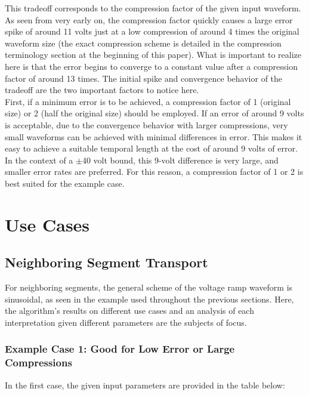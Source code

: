 \documentclass[11pt, a4paper]{article}
\theoremstyle{definition}
\numberwithin{equation}{section}
\begin{document}
This tradeoff corresponds to the compression factor of the given input waveform. As seen from very early on, the compression factor quickly causes a large error spike of around 11 volts just at a low compression of around 4 times the original waveform size (the exact compression scheme is detailed in the compression terminology section at the beginning of this paper). What is important to realize here is that the error begins to converge to a constant value after a compression factor of around 13 times. The initial spike and convergence behavior of the tradeoff are the two important factors to notice here.
\\
First, if a minimum error is to be achieved, a compression factor of 1 (original size) or 2 (half the original size) should be employed. If an error of around 9 volts is acceptable, due to the convergence behavior with larger compressions, very small waveforms can be achieved with minimal differences in error. This makes it easy to achieve a suitable temporal length at the cost of around 9 volts of error. 
\\
In the context of a $\pm$40 volt bound, this 9-volt difference is very large, and smaller error rates are preferred. For this reason, a compression factor of 1 or 2 is best suited for the example case.

\section{Use Cases}
\subsection{Neighboring Segment Transport}
For neighboring segments, the general scheme of the voltage ramp waveform is sinusoidal, as seen in the example used throughout the previous sections. Here, the algorithm's results on different use cases and an analysis of each interpretation given different parameters are the subjects of focus.
\subsubsection{Example Case 1: Good for Low Error or Large Compressions}
In the first case, the given input parameters are provided in the table below:
\end{document}
